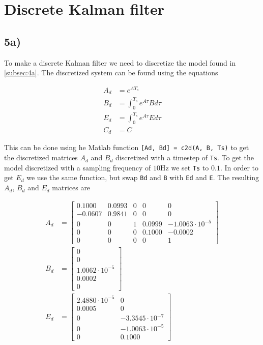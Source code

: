 
\section{Discrete Kalman filter}

\subsection{5a)}

To make a discrete Kalman filter we need to discretize the model found in \cref{subsec:4a}. The discretized system can be found using the equations

\begin{subequations}
    \begin{align}
        A_d &= e^{AT_s} \\
        B_d &= \int_0^{T_s} e^{A\tau}B d\tau \\
        E_d &= \int_0^{T_s} e^{A\tau}E d\tau \\
        C_d &= C
    \end{align}
\end{subequations}

This can be done using he Matlab function \texttt{[Ad, Bd] = c2d(A, B, Ts)} to get the discretized matrices $A_d$ and $B_d$ discretized with a timestep of \texttt{Ts}. To get the model discretized with a sampling frequency of $10\si{\hertz}$ we set \texttt{Ts} to $0.1$. In order to get $E_d$ we use the same function, but swap \texttt{Bd} and \texttt{B} with \texttt{Ed} and \texttt{E}. The resulting $A_d$, $B_d$ and $E_d$ matrices are

\begin{subequations}
    \begin{align}
        A_d &= \begin{bmatrix}
        0.1000 & 0.0993 & 0 & 0 & 0 \\
        -0.0607 & 0.9841 & 0 & 0 & 0 \\
        0 & 0 & 1 & 0.0999 & -1.0063 \cdot 10^{-5} \\
        0 & 0 & 0 & 0.1000 & -0.0002 \\
        0 & 0 & 0 & 0 & 1
        \end{bmatrix} \\
        B_d &= \begin{bmatrix}
        0 \\
        0 \\
        1.0062 \cdot 10^{-5} \\
        0.0002 \\
        0
        \end{bmatrix} \\
        E_ d &= \begin{bmatrix}
        2.4880\cdot 10^{-5} & 0 \\
        0.0005 & 0 \\
        0 & -3.3545\cdot 10^{-7} \\
        0 & -1.0063\cdot 10^{-5} \\
        0 & 0.1000
        \end{bmatrix}
    \end{align}
\end{subequations}

